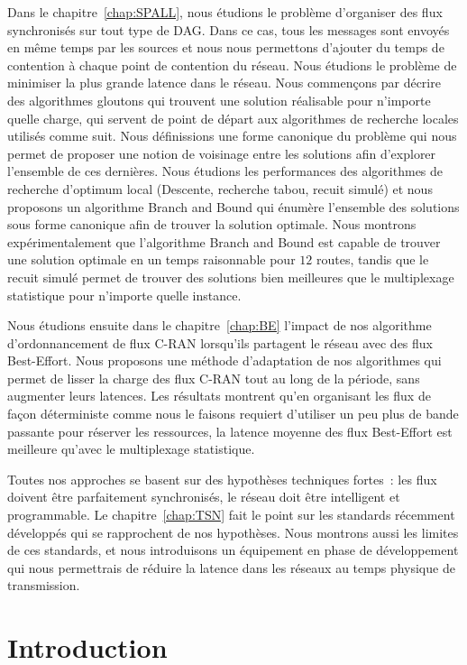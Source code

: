 Dans le chapitre~\ref{chap:SPALL}, nous étudions le problème d'organiser des flux synchronisés sur tout type de DAG. Dans ce cas, tous les messages sont envoyés en même temps par les sources et nous nous permettons d'ajouter du temps de contention à chaque point de contention du réseau. Nous étudions le problème de minimiser la plus grande latence dans le réseau. Nous commençons par décrire des algorithmes gloutons qui trouvent une solution réalisable pour n'importe quelle charge, qui servent de point de départ aux algorithmes de recherche locales utilisés comme suit. Nous définissions une forme canonique du problème qui nous permet de proposer une notion de voisinage entre les solutions afin d'explorer l'ensemble de ces dernières. Nous étudions les performances des algorithmes de recherche d'optimum local (Descente, recherche tabou, recuit simulé) et nous proposons un algorithme Branch and Bound qui énumère l'ensemble des solutions sous forme canonique afin de trouver la solution optimale. Nous montrons expérimentalement que l'algorithme Branch and Bound est capable de trouver une solution optimale en un temps raisonnable pour $12$ routes, tandis que le recuit simulé permet de trouver des solutions bien meilleures que le multiplexage statistique pour n'importe quelle instance.

Nous étudions ensuite dans le chapitre~\ref{chap:BE} l'impact de nos algorithme d'ordonnancement de flux C-RAN lorsqu'ils partagent le réseau avec des flux Best-Effort. Nous proposons une méthode d'adaptation de nos algorithmes qui permet de lisser la charge des flux C-RAN tout au long de la période, sans augmenter leurs latences. Les résultats montrent qu'en organisant les flux de façon déterministe comme nous le faisons requiert d'utiliser un peu plus de bande passante pour réserver les ressources, la latence moyenne des flux Best-Effort est meilleure qu'avec le multiplexage statistique.

Toutes nos approches se basent sur des hypothèses techniques fortes : les flux doivent être parfaitement synchronisés, le réseau doit être intelligent et programmable. Le chapitre~\ref{chap:TSN} fait le point sur les standards récemment développés qui se rapprochent de nos hypothèses. Nous montrons aussi les limites de ces standards, et nous introduisons un équipement en phase de développement qui nous permettrais de réduire la latence dans les réseaux au temps physique de transmission.




\chapter*{Introduction}
\label{chap:introen}
\minitoc



